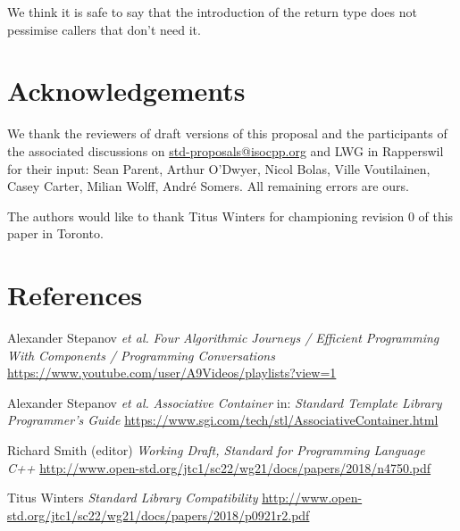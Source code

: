 \documentclass[11pt]{article}
\begin{document}
We think it is safe to say that the introduction of the return type
does not pessimise callers that don't need it.

\section{Acknowledgements}

We thank the reviewers of draft versions of this proposal and the
participants of the associated discussions on
\url{std-proposals@isocpp.org} and LWG in Rapperswil for their input: Sean
Parent, Arthur O'Dwyer, Nicol Bolas, Ville Voutilainen, Casey Carter,
Milian Wolff, Andr\'e Somers. All remaining errors are ours.

The authors would like to thank Titus Winters for championing revision
0 of this paper in Toronto.

\section{References}
\renewcommand{\section}[2]{}%
\begin{thebibliography}{9}
  Alexander Stepanov \emph{et al.}\newline
  \emph{Four Algorithmic Journeys / Efficient Programming With Components /
    Programming Conversations}\newline
  \url{https://www.youtube.com/user/A9Videos/playlists?view=1}

  Alexander Stepanov \emph{et al.}\newline
  \emph{Associative Container}\newline
  in: \emph{Standard Template Library Programmer's Guide}\newline
  \url{https://www.sgi.com/tech/stl/AssociativeContainer.html}

  Richard Smith (editor)\newline
  \emph{Working Draft, Standard for Programming Language C++}\newline
  \url{http://www.open-std.org/jtc1/sc22/wg21/docs/papers/2018/n4750.pdf}

 Titus Winters\newline
  \emph{Standard Library Compatibility}\newline
  \url{http://www.open-std.org/jtc1/sc22/wg21/docs/papers/2018/p0921r2.pdf}
\end{thebibliography}
\end{document}
